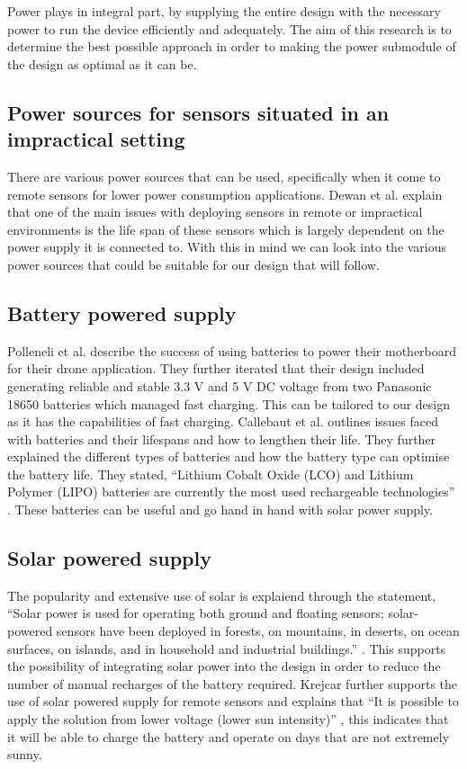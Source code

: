 \documentclass[class=report,11pt,crop=false]{standalone}
\begin{document}
Power plays in integral part, by supplying the entire design with the necessary power to run the device efficiently and adequately. The aim of this research is to determine the best possible approach in order to making the power submodule of the design as optimal as it can be.

\subsection{Power sources for sensors situated in an impractical setting}

There are various power sources that can be used, specifically when it come to remote sensors for lower power consumption applications. Dewan et al. \cite{dewan2014alternative} explain that one of the main issues with deploying sensors in remote or impractical environments is the life span of these sensors which is largely dependent on the power supply it is connected to. With this in mind we can look into the various power sources that could be suitable for our design that will follow.

\subsection{Battery powered supply}

Polleneli et al. \cite{polonelli2020flexible} describe the success of using batteries to power their motherboard for their drone application. They further iterated that their design included generating reliable and stable 3.3 V and 5 V DC voltage from two Panasonic 18650 batteries which managed fast charging. This can be tailored to our design as it has the capabilities of fast charging. Callebaut et al. \cite{callebaut2021art} outlines issues faced with batteries and their lifespans and how to lengthen their life. They further explained the different types of batteries and how the battery type can optimise the battery life. They stated, “Lithium Cobalt Oxide (LCO) and Lithium Polymer (LIPO) batteries are currently the most used rechargeable technologies” \cite{callebaut2021art}. These batteries can be useful and go hand in hand with solar power supply.

\subsection{Solar powered supply}

The popularity and extensive use of solar is explaiend through the statement, “Solar power is used for operating both ground and floating sensors; solar-powered sensors have been deployed in forests, on mountains, in deserts, on ocean surfaces, on islands, and in household and industrial buildings.” \cite{dewan2014alternative}. This supports the possibility of integrating solar power into the design in order to reduce the number of manual recharges of the battery required. Krejcar further supports the use of solar powered supply for remote sensors and explains that “It is possible to apply the solution from lower voltage (lower sun intensity)” \cite{krejcar2012optimized}, this indicates that it will be able to charge the battery and operate on days that are not extremely sunny.
\end{document}
